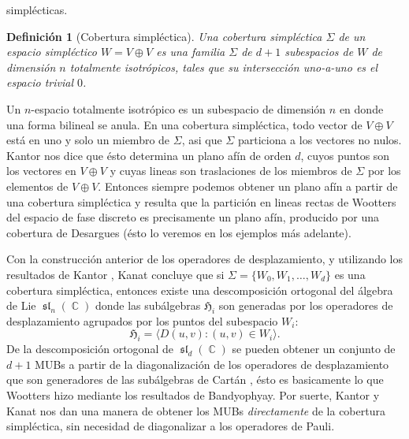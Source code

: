 \documentclass[a4paper,11pt]{report}
\DeclareMathOperator{\C}{\mathbb{C}}
\DeclareMathOperator{\Sl}{\mathfrak{sl}}
\newtheorem{definition}{Definición}
\begin{document}
  simplécticas.
  \begin{definition}[Cobertura simpléctica]
    Una cobertura simpléctica $\Sigma$ de un espacio
    simpléctico $W = V \oplus V$ es una familia $\Sigma$ de
    $d+1$ subespacios de $W$ de dimensión $n$ totalmente
    isotrópicos, tales que su intersección uno-a-uno es el
    espacio trivial $0$. 
  \end{definition}
  Un $n$-espacio totalmente isotrópico es un subespacio de
  dimensión $n$ en donde una forma bilineal se anula. En una
  cobertura simpléctica, todo vector de $V \oplus V$ está en
  uno y solo un miembro de $\Sigma$, asi que $\Sigma$
  particiona a los vectores no nulos. Kantor nos dice que
  ésto determina un plano afín de orden $d$, cuyos puntos
  son los vectores en $V \oplus V$ y cuyas lineas son
  traslaciones de los miembros de $\Sigma$ por los elementos
  de $V \oplus V$. Entonces siempre podemos obtener un plano
  afín a partir de una cobertura simpléctica y resulta que
  la partición en lineas rectas de Wootters del espacio de
  fase discreto es precisamente un plano afín, producido por
  una cobertura de Desargues (ésto lo veremos en los
  ejemplos más adelante).

  Con la construcción anterior de los operadores de
  desplazamiento, y utilizando los resultados de Kantor
  \cite{kantor1996}, Kanat concluye que si $\Sigma = \{W_0,
  W_1, \ldots, W_d\}$ es una cobertura simpléctica, entonces
  existe una descomposición ortogonal del álgebra de Lie
  $\Sl_n(\C)$ donde las subálgebras $\mathfrak{H}_i$ son
  generadas por los operadores de desplazamiento agrupados
  por los puntos del subespacio $W_i$:
  \begin{equation}
    \mathfrak{H}_i = \langle D(u,v) : (u,v) \in W_i \rangle.
  \end{equation}
  De la descomposición ortogonal de $\Sl_d(\C)$ se pueden
  obtener un conjunto de $d+1$ MUBs a partir de la
  diagonalización de los operadores de desplazamiento que
  son generadores de las subálgebras de Cartán
  \cite{boykin2005}, ésto es basicamente lo que Wootters
  hizo mediante los resultados de Bandyophyay. Por suerte,
  Kantor y Kanat nos dan una manera de obtener los MUBs
  \textit{directamente} de la cobertura simpléctica, sin
  necesidad de diagonalizar a los operadores de Pauli.
  
\end{document}

